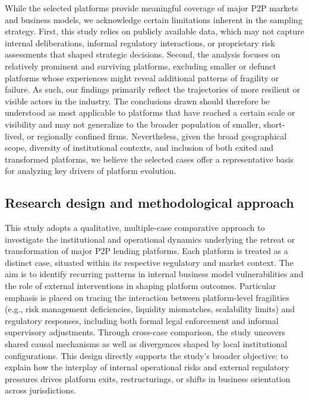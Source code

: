 \documentclass[pdflatex,sn-apa]{sn-jnl}%
\theoremstyle{thmstyleone}%
\theoremstyle{thmstyletwo}%
\theoremstyle{thmstylethree}%
\begin{document}
\textcolor{NavyBlue}{
While the selected platforms provide meaningful coverage of major P2P markets and business models, we acknowledge certain limitations inherent in the sampling strategy. First, this study relies on publicly available data, which may not capture internal deliberations, informal regulatory interactions, or proprietary risk assessments that shaped strategic decisions. Second, the analysis focuses on relatively prominent and surviving platforms, excluding smaller or defunct platforms whose experiences might reveal additional patterns of fragility or failure. As such, our findings primarily reflect the trajectories of more resilient or visible actors in the industry. The conclusions drawn should therefore be understood as most applicable to platforms that have reached a certain scale or visibility and may not generalize to the broader population of smaller, short-lived, or regionally confined firms. Nevertheless, given the broad geographical scope, diversity of institutional contexts, and inclusion of both exited and transformed platforms, we believe the selected cases offer a representative basis for analyzing key drivers of platform evolution.}

\subsection{Research design and methodological approach}
This study adopts a qualitative, multiple-case comparative approach to investigate the institutional and operational dynamics underlying the retreat or transformation of major P2P lending platforms. Each platform is treated as a distinct case, situated within its respective regulatory and market context. The aim is to identify recurring patterns in internal business model vulnerabilities and the role of external interventions in shaping platform outcomes. Particular emphasis is placed on tracing the interaction between platform-level fragilities (e.g., risk management deficiencies, liquidity mismatches, scalability limits) and regulatory responses, including both formal legal enforcement and informal supervisory adjustments. Through cross-case comparison, the study uncovers shared causal mechanisms as well as divergences shaped by local institutional configurations. This design directly supports the study’s broader objective: to explain how the interplay of internal operational risks and external regulatory pressures drives platform exits, restructurings, or shifts in business orientation across jurisdictions.
\end{document}
